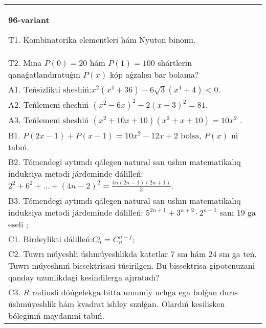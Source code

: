 \documentclass{article}
\begin{document}
\begin{tabular}{m{17cm}}
\textbf{96-variant}
\newline

T1. Kombinatorika elementleri hám Nyuton binomı. \\
T2. Mına \(P(0) = 20\) hám \(P(1) = 100\) shártlerin qanaǵatlandıratuǵın \(P(x)\) kóp aǵzalısı bar bolama? \\
A1. Teńsizlikti sheshiń:\(x^{2}\left( x^{4} + 36 \right) - 6\sqrt{3}\left( x^{4} + 4 \right) < 0\). \\
A2. Teńlemeni sheshiń \(\left( x^{2} - 6x \right)^{2} - 2(x - 3)^{2} = 81\). \\
A3. Teńlemeni sheshiń \(\left( x^{2} + 10x + 10 \right)\left( x^{2} + x + 10 \right) = 10x^{2}\) . \\
B1. \(P(2x - 1) + P(x - 1) = 10x^{2} - 12x + 2\) bolsa, \(P(x)\) ni tabıń. \\
B2. Tómendegi aytımdı qálegen natural san ushın matematikalıq induksiya metodi járdeminde dálilleń: \(2^{2} + 6^{2} + \ldots + (4n - 2)^{2} = \frac{4n(2n - 1)(2n + 1)}{3}\). \\
B3. Tómendegi aytımdı qálegen natural san ushın matematikalıq induksiya metodi járdeminde dálilleń: \(5^{2n + 1} + 3^{n + 2} \cdot 2^{n - 1}\) sanı 19 ga eseli ; \\
C1. Birdeylikti dálilleń:\(C_{n}^{j} = C_{n}^{n - j}\); \\
C2. Tuwrı múyeshli úshmúyeshlikda katetlar 7 sm hám 24 sm ga teń. Tuwrı múyeshnıń bissektrisasi túsirilgen. Bu bissektrisa gipotenuzani qanday uzunlikdagi kesindilerga ajıratadı? \\
C3. \(R\) radiusli dóńgelekga bitta umumiy uchga ega bolǵan durıs úshmúyeshlik hám kvadrat ishley sızılǵan. Olardıń kesilisken bóleginıń maydanıni tabıń. \\

\end{tabular}
\vspace{1cm}
\end{document}
